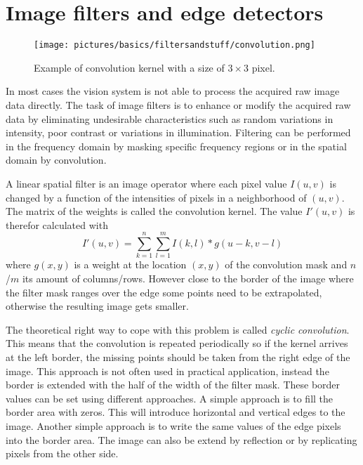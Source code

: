 \section{Image filters and edge detectors}
\label{chapter::imagefilteredgedetector}
\begin{figure}[h]
\centering
\texttt{[image: pictures/basics/filtersandstuff/convolution.png]}
\caption{Example of convolution kernel with a size of $3\times3$ pixel.\cite{Jean2017}}
\label{fig:convolution}
\end{figure}
In most cases the vision system is not able to process the acquired raw image data directly. The task of image filters is to enhance or modify the acquired raw data by eliminating undesirable characteristics such as random variations in intensity, poor contrast or variations in illumination\cite{Beyerer2016}. Filtering can be performed in the frequency domain by masking specific frequency regions or in the spatial domain by convolution. 

A linear spatial filter is an image operator where each pixel value $I(u,v)$ is changed by a function of the intensities of pixels in a neighborhood of $(u,v)$\cite{utah1}. The matrix of the weights is called the convolution kernel. The value $I'(u,v)$ is therefor calculated with
\begin{equation}
I'(u,v) = \sum_{k=1}^{n} \sum_{l=1}^{m} I(k,l) * g(u-k, v-l)
\end{equation}
where $g(x,y)$ is a weight at the location $(x,y)$ of the convolution mask and $n$/$m$ its amount of columns/rows.
However close to the border of the image where the filter mask ranges over the edge some points need to be extrapolated, otherwise the resulting image gets smaller. 

The theoretical right way to cope with this problem is called \textit{cyclic convolution}. This means that the convolution is repeated periodically so if the kernel arrives at the left border, the missing points should be taken from the right edge of the image\cite{Jahne2005}. This approach is not often used in practical application, instead the border is extended with the half of the width of the filter mask. These border values can be set using different approaches. A simple approach is to fill the border area with zeros. This will introduce horizontal and vertical edges to the image. Another simple approach is to write the same values of the edge pixels into the border area. The image can also be extend by reflection or by replicating pixels from the other side. 

